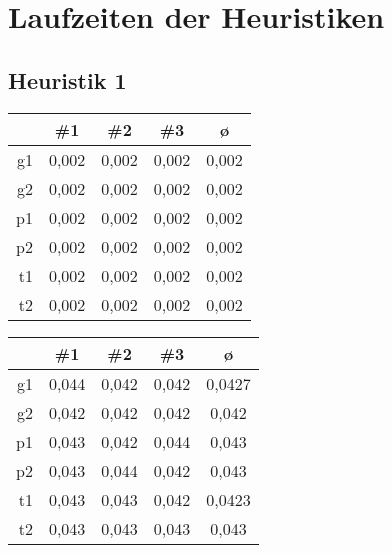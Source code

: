 \section{Laufzeiten der Heuristiken} \label{sec:app_laufzeiten}

\subsection{Heuristik 1} \label{app:heuristik1_laufzeit}

        \begin{center}
            \begin{tabular}{|r|S[table-format=1.3]|S[table-format=1.3]|S[table-format=1.3]|S[table-format=1.3]|}
                \hline
                 & {\#1} & {\#2} & {\#3} & ø \\\hline
                g1 & 0,002 & 0,002 & 0,002 & 0,002 \\\hline
                g2 & 0,002 & 0,002 & 0,002 & 0,002 \\\hline
                p1 & 0,002 & 0,002 & 0,002 & 0,002 \\\hline
                p2 & 0,002 & 0,002 & 0,002 & 0,002 \\\hline
                t1 & 0,002 & 0,002 & 0,002 & 0,002 \\\hline
                t2 & 0,002 & 0,002 & 0,002 & 0,002 \\\hline
            \end{tabular}
        \end{center}
        \begin{center}
            \begin{tabular}{|r|S[table-format=1.3]|S[table-format=1.3]|S[table-format=1.3]|S[table-format=1.4]|}
                \hline
                 & {\#1} & {\#2} & {\#3} & ø \\\hline
                g1 & 0,044 & 0,042 & 0,042 & 0,0427 \\\hline
                g2 & 0,042 & 0,042 & 0,042 & 0,042  \\\hline
                p1 & 0,043 & 0,042 & 0,044 & 0,043  \\\hline
                p2 & 0,043 & 0,044 & 0,042 & 0,043  \\\hline
                t1 & 0,043 & 0,043 & 0,042 & 0,0423 \\\hline
                t2 & 0,043 & 0,043 & 0,043 & 0,043  \\\hline
            \end{tabular}
        \end{center}

